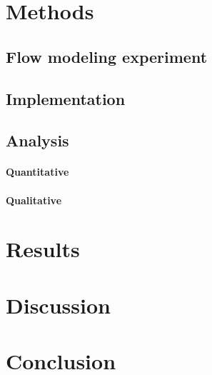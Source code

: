 \documentclass{isprs}
\begin{document}
\section{Methods}\label{sec:methods}

\subsection{Flow modeling experiment}









\subsection{Implementation}

\subsection{Analysis}

\paragraph{Quantitative}

\paragraph{Qualitative}

\section{Results}\label{sec:results}



\section{Discussion}\label{sec:discussion}



\section{Conclusion}\label{sec:conclusion}
\end{document}
